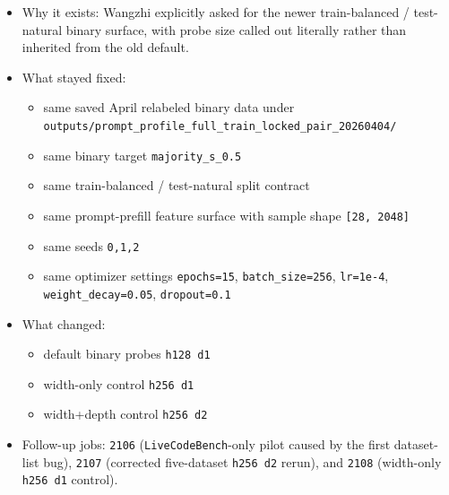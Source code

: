 \documentclass[11pt]{article}
\begin{document}
\begin{itemize}[leftmargin=1.5em]
\item Why it exists: Wangzhi explicitly asked for the newer train-balanced / test-natural binary surface, with probe size called out literally rather than inherited from the old default.
\item What stayed fixed:
  \begin{itemize}[leftmargin=1.5em]
  \item same saved April relabeled binary data under \texttt{outputs/prompt\_profile\_full\_train\_locked\_pair\_20260404/}
  \item same binary target \texttt{majority\_s\_0.5}
  \item same train-balanced / test-natural split contract
  \item same prompt-prefill feature surface with sample shape \texttt{[28, 2048]}
  \item same seeds \texttt{0,1,2}
  \item same optimizer settings \texttt{epochs=15}, \texttt{batch\_size=256}, \texttt{lr=1e-4}, \texttt{weight\_decay=0.05}, \texttt{dropout=0.1}
  \end{itemize}
\item What changed:
  \begin{itemize}[leftmargin=1.5em]
  \item default binary probes \texttt{h128 d1}
  \item width-only control \texttt{h256 d1}
  \item width+depth control \texttt{h256 d2}
  \end{itemize}
\item Follow-up jobs: \texttt{2106} (\texttt{LiveCodeBench}-only pilot caused by the first dataset-list bug), \texttt{2107} (corrected five-dataset \texttt{h256 d2} rerun), and \texttt{2108} (width-only \texttt{h256 d1} control).
\end{itemize}
\end{document}
